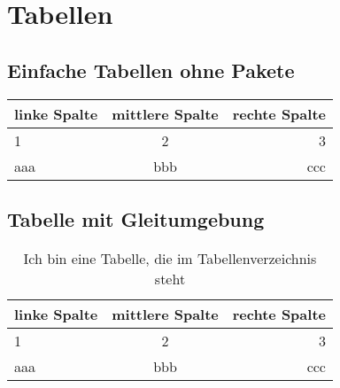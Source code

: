 \chapter{Tabellen}
		
	\section{Einfache Tabellen ohne Pakete}
	
		\begin{tabular}{l|c|r}
			linke Spalte & mittlere Spalte & rechte Spalte \\\hline
			1            &        2        &             3 \\
			aaa          &       bbb       &           ccc
		\end{tabular}
		
	\section{Tabelle mit Gleitumgebung}
		
		\begin{table}[htb]													%
			\centering															%
			\begin{tabular}{l|c|r}												%
				linke Spalte & mittlere Spalte & rechte Spalte \\\hline
				1            &        2        &             3 \\
				aaa          &       bbb       &           ccc
			\end{tabular}
			\caption{Ich bin eine Tabelle, die im Tabellenverzeichnis steht}	%
			\label{tab:table}													%
		\end{table}
		
